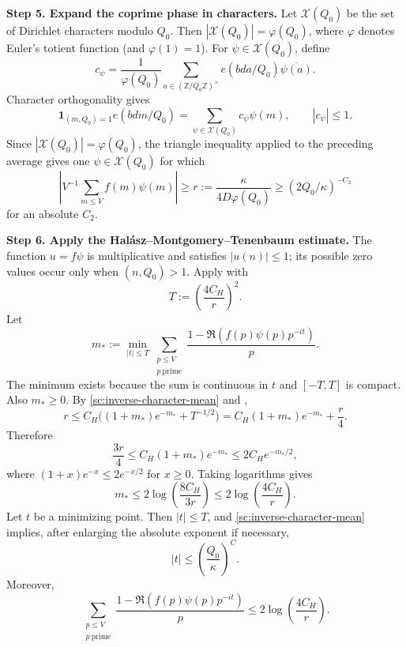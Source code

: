 \documentclass[twoside]{aomart}
\makeatletter
\theoremstyle{paperplain}
\theoremstyle{paperdefinition}
\renewenvironment{proof}[1][\proofname]{\par\pushQED{\qed}%
  \normalfont\topsep6\p@\@plus3\p@\relax\trivlist
  \item[\hskip\labelsep\itshape #1\@addpunct{.}]\ignorespaces
}{\popQED\endtrivlist\@endpefalse}
\newcommand{\Z}{\mathbb Z}
\numberwithin{equation}{section}
\makeatother
\begin{document}
\begin{proof}
\par
\medskip
\noindent\textbf{Step 5. Expand the coprime phase in characters.}
Let $\mathcal X(Q_0)$ be the set of Dirichlet characters modulo $Q_0$.
Then $|\mathcal X(Q_0)|=\varphi(Q_0)$, where $\varphi$ denotes
Euler's totient function (and $\varphi(1)=1$). For $\psi\in\mathcal X(Q_0)$,
define
\[
 c_\psi=\frac1{\varphi(Q_0)}
    \sum_{a\in(\Z/Q_0\Z)^\times}e(bda/Q_0)\overline{\psi(a)}.
\]
Character orthogonality gives
\begin{equation*}
 \mathbf1_{(m,Q_0)=1}e(bdm/Q_0)
   =\sum_{\psi\in\mathcal X(Q_0)}c_\psi\psi(m),
 \qquad |c_\psi|\le1.
\end{equation*}
Since $|\mathcal X(Q_0)|=\varphi(Q_0)$, the triangle inequality
applied to the preceding average gives one $\psi\in\mathcal X(Q_0)$ for which
\begin{equation}
 \left|V^{-1}\sum_{m\le V}f(m)\psi(m)\right|
 \ge r:=\frac{\kappa}{4D\varphi(Q_0)}
 \ge(2Q_0/\kappa)^{-C_2}
 \label{sc:inverse-character-mean}
\end{equation}
for an absolute $C_2$.

\par
\medskip
\noindent\textbf{Step 6. Apply the Hal\'asz--Montgomery--Tenenbaum estimate.}
The function $u=f\psi$ is multiplicative and satisfies $|u(n)|\le1$;
its possible zero values occur only when $(n,Q_0)>1$. Apply
 with
\[
 T:=\left(\frac{4C_H}{r}\right)^2.
\]
Let
\[
 m_*:=\min_{|t|\le T}\sum_{\substack{p\le V\\p\ \mathrm{prime}}}
 \frac{1-\Re(f(p)\psi(p)p^{-it})}{p}.
\]
The minimum exists because the sum is continuous in $t$ and
$[-T,T]$ is compact. Also $m_*\ge0$. By
\eqref{sc:inverse-character-mean} and ,
\[
 r\le C_H\bigl((1+m_*)e^{-m_*}+T^{-1/2}\bigr)
 =C_H(1+m_*)e^{-m_*}+\frac r4.
\]
Therefore
\[
 \frac{3r}{4}\le C_H(1+m_*)e^{-m_*}
 \le2C_He^{-m_*/2},
\]
where $(1+x)e^{-x}\le2e^{-x/2}$ for $x\ge0$.
Taking logarithms gives
\[
 m_*\le2\log\left(\frac{8C_H}{3r}\right)
 \le2\log\left(\frac{4C_H}{r}\right).
\]
Let $t$ be a minimizing point. Then $|t|\le T$, and
\eqref{sc:inverse-character-mean} implies, after enlarging the
absolute exponent if necessary,
\begin{equation*}
 |t|\le\left(\frac{Q_0}{\kappa}\right)^C.
\end{equation*}
Moreover,
\begin{equation*}
 \sum_{\substack{p\le V\\p\ \mathrm{prime}}}\frac{1-\Re(f(p)\psi(p)p^{-it})}{p}
 \le2\log\left(\frac{4C_H}{r}\right).
\end{equation*}


\end{proof}
\end{document}
